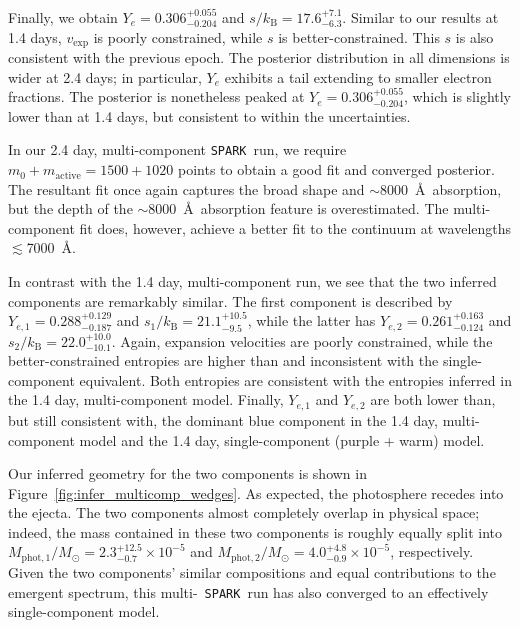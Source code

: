 \documentclass[twocolumn,twocolappendix]{aastex63}
\def\SPARK{\texttt{SPARK}}
\begin{document}
Finally, we obtain $Y_e = 0.306^{+0.055}_{-0.204}$ and $s/k_{\mathrm{B}} = 17.6^{+7.1}_{-6.3}$. Similar to our results at 1.4 days, $v_{\mathrm{exp}}$ is poorly constrained, while $s$ is better-constrained. This $s$ is also consistent with the previous epoch. The posterior distribution in all dimensions is wider at 2.4 days; in particular, $Y_e$ exhibits a tail extending to smaller electron fractions. The posterior is nonetheless peaked at $Y_e = 0.306^{+0.055}_{-0.204}$, which is slightly lower than at 1.4 days, but consistent to within the uncertainties. 

In our 2.4 day, multi-component \SPARK~run, we require $m_0 + m_{\mathrm{active}} = 1500 + 1020$ points to obtain a good fit and converged posterior. The resultant fit once again captures the broad shape and $\sim$8000~\AA~absorption, but the depth of the $\sim$8000~\AA~absorption feature is overestimated. The multi-component fit does, however, achieve a better fit to the continuum at wavelengths $\lesssim$7000~\AA. 

In contrast with the 1.4 day, multi-component run, we see that the two inferred components are remarkably similar.  The first component is described by $Y_{e,1} = 0.288^{+0.129}_{-0.187}$ and $s_1 / k_{\mathrm{B}} = 21.1^{+10.5}_{-9.5}$, while the latter has $Y_{e,2} = 0.261^{+0.163}_{-0.124}$ and $s_2 / k_{\mathrm{B}} = 22.0^{+10.0}_{-10.1}$. Again, expansion velocities are poorly constrained, while the better-constrained entropies are higher than and inconsistent with the single-component equivalent. Both entropies are consistent with the entropies inferred in the 1.4 day, multi-component model. Finally, $Y_{e,1}$ and $Y_{e,2}$ are both lower than, but still consistent with, the dominant blue component in the 1.4 day, multi-component model and the 1.4 day, single-component (purple + warm) model.

Our inferred geometry for the two components is shown in Figure~\ref{fig:infer_multicomp_wedges}. As expected, the photosphere recedes into the ejecta. The two components almost completely overlap in physical space; indeed, the mass contained in these two components is roughly equally split into $M_{\mathrm{phot},1}/M_{\odot} = 2.3^{+12.5}_{-0.7} \times 10^{-5}$ and $M_{\mathrm{phot},2}/M_{\odot} = 4.0^{+4.8}_{-0.9} \times 10^{-5}$, respectively. Given the two components' similar compositions and equal contributions to the emergent spectrum, this multi-~\SPARK~run has also converged to an effectively single-component model.
\end{document}
